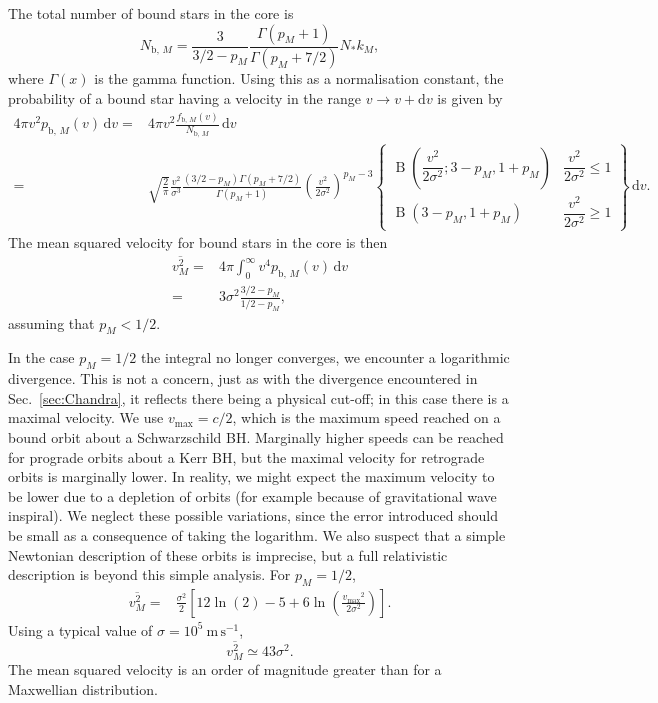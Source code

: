 \documentclass[useAMS,usedcolumn,usegraphicx,usenatbib]{mn2e}
\newcommand{\secref}[1]{Sec.~\ref{sec:#1}}
\DeclareMathOperator{\Beta}{B}
\newcommand{\units}[1]{\ensuremath{~\mathrm{#1}}}
\newcommand{\sub}[1]{\ensuremath{_\mathrm{#1}}}
\newcommand{\dd}{\ensuremath{\mathrm{d}}}
\newcommand{\intd}[4]{\ensuremath{\displaystyle \int_{#1}^{#2}{#3}\,\dd{#4}}}
\begin{document}
\begin{onecolumn}
The total number of bound stars in the core is
\begin{equation}
N_{\mathrm{b},\,M} = \frac{3}{3/2 - p_M}\frac{\Gamma(p_M + 1)}{\Gamma(p_M + 7/2)}N_\ast k_M,
\end{equation}
where $\Gamma(x)$ is the gamma function. Using this as a normalisation constant, the probability of a bound star having a velocity in the range $v \rightarrow v + \dd v$ is given by
\begin{align}
4\pi v^2 p_{\mathrm{b},\,M}(v) \,\dd v = {} & 4\pi v^2 \frac{f_{\mathrm{b},\,M}(v)}{N_{\mathrm{b},\,M}} \,\dd v \\
 = {} & \sqrt{\frac{2}{\pi}} \frac{v^2}{\sigma^3} \frac{\left(3/2 - p_M\right)\Gamma(p_M + 7/2)}{\Gamma(p_M + 1)} \left(\frac{v^2}{2\sigma^2}\right)^{p_M - 3}\left\{\begin{array}{lr}
\Beta\left(\dfrac{v^2}{2\sigma^2}; 3 - p_M, 1 + p_M\right) & \dfrac{v^2}{2\sigma^2} \leq 1 \\
\Beta\left(3 - p_M, 1 + p_M\right) & \dfrac{v^2}{2\sigma^2} \geq 1\end{array}\right\}\,\dd v.
\end{align}
The mean squared velocity for bound stars in the core is then
\begin{align}
\overline{v^2_{M}} = {} & 4\pi\intd{0}{\infty}{v^4 p_{\mathrm{b},\,M}(v)}{v} \\
 = {} & 3\sigma^2\frac{3/2 - p_M}{1/2 - p_M},
\end{align}
assuming that $p_M < 1/2$.

In the case $p_M = 1/2$ the integral no longer converges, we encounter a logarithmic divergence. This is not a concern, just as with the divergence encountered in \secref{Chandra}, it reflects there being a physical cut-off; in this case there is a maximal velocity. We use $v\sub{max} = c/2$, which is the maximum speed reached on a bound orbit about a Schwarzschild BH. Marginally higher speeds can be reached for prograde orbits about a Kerr BH, but the maximal velocity for retrograde orbits is marginally lower. In reality, we might expect the maximum velocity to be lower due to a depletion of orbits (for example because of gravitational wave inspiral). We neglect these possible variations, since the error introduced should be small as a consequence of taking the logarithm. We also suspect that a simple Newtonian description of these orbits is imprecise, but a full relativistic description is beyond this simple analysis. For $p_M = 1/2$,
\begin{align}
\overline{v^2_{M}} = {} & \frac{\sigma^2}{2}\left[12\ln(2) - 5 + 6 \ln\left(\frac{v\sub{max}^2}{2\sigma^2}\right)\right].
\end{align}
Using a typical value of $\sigma = 10^5\units{m\,s^{-1}}$,
\begin{equation}
\overline{v^2_{M}} \simeq 43\sigma^2.
\end{equation}
The mean squared velocity is an order of magnitude greater than for a Maxwellian distribution.


\end{onecolumn}
\end{document}
